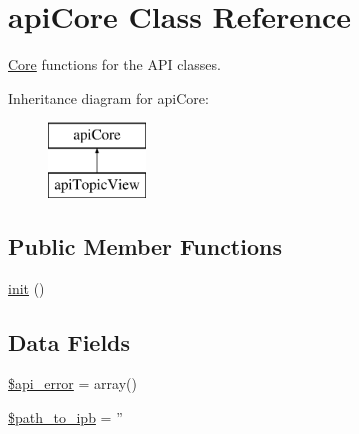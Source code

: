 \hypertarget{classapi_core}{\section{api\-Core Class Reference}
\label{classapi_core}
}


\hyperlink{namespace_core}{Core} functions for the A\-P\-I classes.  


Inheritance diagram for api\-Core\-:\begin{figure}[H]
\begin{center}
\leavevmode
\includegraphics[height=2.000000cm]{classapi_core}
\end{center}
\end{figure}
\subsection*{Public Member Functions}
\begin{DoxyCompactItemize}
\item 
\hyperlink{classapi_core_a4be4055f3361d4800e16bc2e2e38cda6}{init} ()
\end{DoxyCompactItemize}
\subsection*{Data Fields}
\begin{DoxyCompactItemize}
\item 
\hyperlink{classapi_core_a8de045182e6b93cdd322b737bd497323}{\$api\-\_\-error} = array()
\item 
\hyperlink{classapi_core_a5dc1dfff75b3d40c93b877a0721f6bd7}{\$path\-\_\-to\-\_\-ipb} = ''
\end{DoxyCompactItemize}
